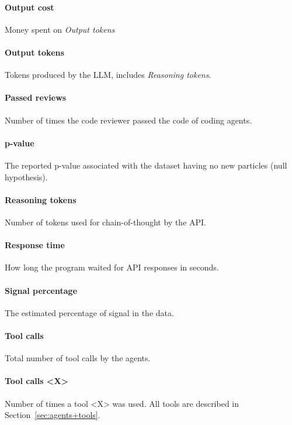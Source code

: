 \documentclass[submission, Phys]{SciPost}
\begin{document}
\paragraph{Output cost} Money spent on \emph{Output tokens}

\paragraph{Output tokens} Tokens produced by the LLM, includes \emph{Reasoning tokens}.

\paragraph{Passed reviews} Number of times the code reviewer passed the code of coding agents.

\paragraph{p-value} The reported p-value associated with the dataset having no new particles (null hypothesis).

\paragraph{Reasoning tokens} Number of tokens used for chain-of-thought by the API.

\paragraph{Response time}  How long the program waited for API responses in seconds. 

\paragraph{Signal percentage} The estimated percentage of signal in the data.

\paragraph{Tool calls} Total number of tool calls by the agents.  

\paragraph{Tool calls <X>} Number of times a tool <X> was used. All tools are described in Section~\ref{sec:agents+tools}.  
\end{document}
